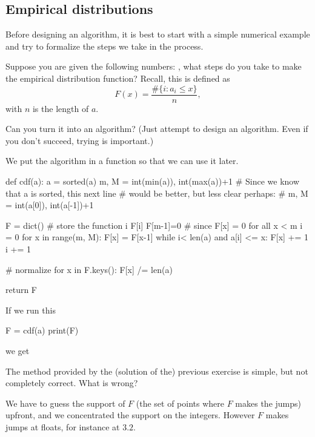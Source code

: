\documentclass{scrartcl}
\begin{document}
\subsection{Empirical distributions}
\label{sec:empir-distr}

Before designing an algorithm, it is best to start with a simple numerical example and try to formalize the steps we take in the process.

\begin{exercise}
  Suppose you are given the following numbers: , what steps  do you  take to make the empirical distribution function? Recall, this is defined as
  \begin{equation}
    \label{eq:1}
    F(x) = \frac{\# \{i : a_i \leq x\}}{n}, 
  \end{equation}
  with $n$ is the length of $a$.

Can you turn it into an algorithm? (Just attempt to design an algorithm. Even if you don't succeed, trying is important.)

  \begin{solution}
We put the algorithm in a function so that we can use it later.
    \begin{pyblock}
def cdf(a):
    a = sorted(a)
    m, M = int(min(a)), int(max(a))+1
    # Since we know that a is sorted, this next line 
    # would be better, but less clear perhaps: 
    # m, M = int(a[0]), int(a[-1])+1 

    F = dict() # store the function i \to F[i]
    F[m-1]=0  # since F[x] = 0 for all x < m
    i = 0
    for x in range(m, M):
        F[x] = F[x-1]
        while i< len(a) and a[i] <= x:
            F[x] += 1
            i += 1

    # normalize
    for x in F.keys(): 
        F[x] /= len(a)

    return F
    \end{pyblock}

If we run this
\begin{pyblock}
F = cdf(a)
print(F)
\end{pyblock}
we get
\printpythontex
  \end{solution}
\end{exercise}

\begin{exercise}
  The method provided by the (solution of the) previous exercise is simple, but not completely correct. What is wrong?
  \begin{solution}
    We have to guess the support of $F$ (the set of points where $F$ makes the jumps) upfront, and we concentrated the support on the integers. However $F$ makes jumps at floats, for instance  at $3.2$. 
  \end{solution}
\end{exercise}
\end{document}
